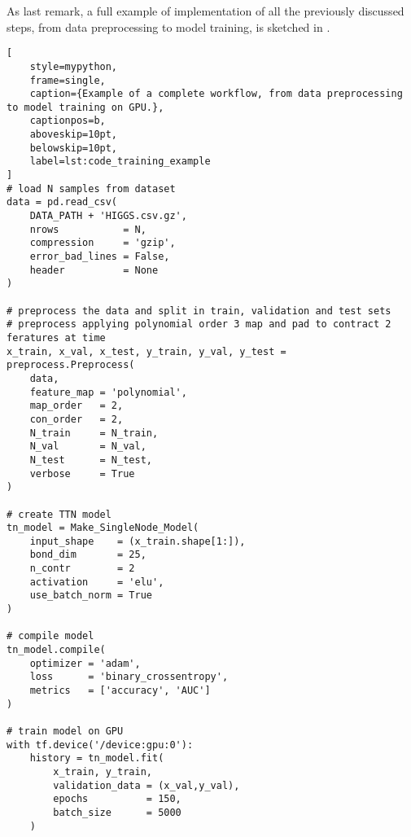\documentclass[../main/main.tex]{subfiles}
\begin{document}
As last remark, a full example of implementation of all the previously discussed steps, from data preprocessing to model training, is sketched in .

\begin{lstlisting}[
    style=mypython,
    frame=single,
    caption={Example of a complete workflow, from data preprocessing to model training on GPU.},
    captionpos=b,
    aboveskip=10pt,
    belowskip=10pt,
    label=lst:code_training_example
]
# load N samples from dataset
data = pd.read_csv(
    DATA_PATH + 'HIGGS.csv.gz',
    nrows           = N,
    compression     = 'gzip',
    error_bad_lines = False,
    header          = None
)

# preprocess the data and split in train, validation and test sets
# preprocess applying polynomial order 3 map and pad to contract 2 feratures at time
x_train, x_val, x_test, y_train, y_val, y_test = preprocess.Preprocess(
    data,
    feature_map = 'polynomial',
    map_order   = 2,
    con_order   = 2,
    N_train     = N_train,
    N_val       = N_val,
    N_test      = N_test,
    verbose     = True
)

# create TTN model
tn_model = Make_SingleNode_Model(
    input_shape    = (x_train.shape[1:]),
    bond_dim       = 25,
    n_contr        = 2
    activation     = 'elu',
    use_batch_norm = True
)

# compile model
tn_model.compile(
    optimizer = 'adam',
    loss      = 'binary_crossentropy',
    metrics   = ['accuracy', 'AUC']
)

# train model on GPU
with tf.device('/device:gpu:0'):
    history = tn_model.fit(
        x_train, y_train,
        validation_data = (x_val,y_val),
        epochs          = 150,
        batch_size      = 5000
    )
\end{lstlisting}
\end{document}
